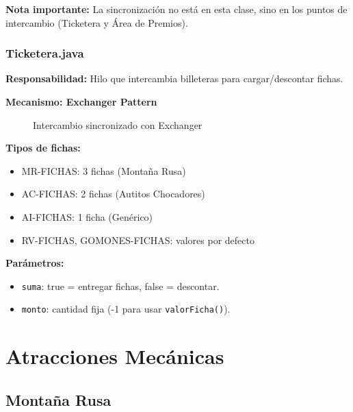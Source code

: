 \documentclass[12pt,a4paper]{article}
\begin{document}
\textbf{Nota importante:} La sincronización no está en esta clase, sino en los puntos de intercambio (Ticketera y Área de Premios).

\subsubsection{Ticketera.java}

\textbf{Responsabilidad:} Hilo que intercambia billeteras para cargar/descontar fichas.

\textbf{Mecanismo: Exchanger Pattern}

\begin{figure}[H]
\centering
{}
\caption{Intercambio sincronizado con Exchanger}
\end{figure}

\textbf{Tipos de fichas:}
\begin{itemize}
    \item MR-FICHAS: 3 fichas (Montaña Rusa)
    \item AC-FICHAS: 2 fichas (Autitos Chocadores)
    \item AI-FICHAS: 1 ficha (Genérico)
    \item RV-FICHAS, GOMONES-FICHAS: valores por defecto
\end{itemize}

\textbf{Parámetros:}
\begin{itemize}
    \item \texttt{suma}: true = entregar fichas, false = descontar.
    \item \texttt{monto}: cantidad fija (-1 para usar \texttt{valorFicha()}).
\end{itemize}
\newpage

\section{Atracciones Mecánicas}

\subsection{Montaña Rusa}
\end{document}
